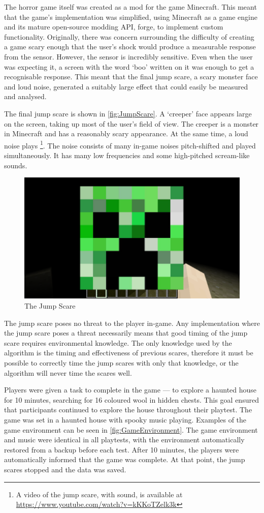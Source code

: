 \documentclass[12pt,a4paper]{article}\usepackage[]{graphicx}\usepackage[]{color}
\begin{document}
The horror game itself was created as a mod for the game Minecraft.
This meant that the game's implementation was simplified, using Minecraft as a game engine and its mature open-source modding API, forge, to implement custom functionality.
Originally, there was concern surrounding the difficulty of creating a game scary enough that the user's shock would produce a measurable response from the sensor.
However, the sensor is incredibly sensitive.
Even when the user was expecting it, a screen with the word `boo' written on it was enough to get a recognisable response.
This meant that the final jump scare, a scary monster face and loud noise, generated a suitably large effect that could easily be measured and analysed.

The final jump scare is shown in \vref{fig:JumpScare}.
A `creeper' face appears large on the screen, taking up most of the user's field of view.
The creeper is a monster in Minecraft and has a reasonably scary appearance.
At the same time, a loud noise plays \footnote{A video of the jump scare, with sound, is available at \url{https://www.youtube.com/watch?v=kKKoTZelk3k}}.
The noise consists of many in-game noises pitch-shifted and played simultaneously.
It has many low frequencies and some high-pitched scream-like sounds.

\begin{figure}[htb]
	\centering
	\includegraphics[width=0.5\linewidth]{images/scare.png}
	\caption{The Jump Scare}
	\label{fig:JumpScare}
\end{figure}

The jump scare poses no threat to the player in-game.
Any implementation where the jump scare poses a threat necessarily means that good timing of the jump scare requires environmental knowledge.
The only knowledge used by the algorithm is the timing and effectiveness of previous scares, therefore it must be possible to correctly time the jump scares with only that knowledge, or the algorithm will never time the scares well.

Players were given a task to complete in the game --- to explore a haunted house for 10 minutes, searching for 16 coloured wool in hidden chests.
This goal ensured that participants continued to explore the house throughout their playtest.
The game was set in a haunted house with spooky music playing.
Examples of the game environment can be seen in \vref{fig:GameEnvironment}.
The game environment and music were identical in all playtests, with the environment automatically restored from a backup before each test.
After 10 minutes, the players were automatically informed that the game was complete.
At that point, the jump scares stopped and the data was saved.
\end{document}
